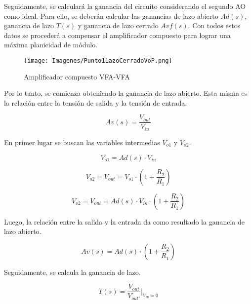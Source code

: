 \documentclass[12pt,A4paper,titlepage]{article}
\begin{document}
\bigskip
\hspace{1mm} Seguidamente, se calculará la ganancia del circuito considerando el segundo AO como ideal. Para ello, se deberán calcular las ganancias de lazo abierto \(Ad(s)\), ganancia de lazo \(T(s)\) y ganancia de lazo cerrado \(Avf(s)\). Con todos estos datos se procederá a compensar el amplificador compuesto para lograr una máxima planicidad de módulo.

\begin{figure}[!h]
    \centering
    \texttt{[image: Imagenes/Punto1LazoCerradoVoP.png]}
    \caption{Amplificador compuesto VFA-VFA}
\end{figure}

\hspace{1mm} Por lo tanto, se comienza obteniendo la ganancia de lazo abierto. Esta misma es la relación entre la tensión de salida y la tensión de entrada.

\begin{equation}
    Av(s) = \frac{V_{out}}{V_{in}}
\end{equation}

\bigskip
\hspace{1mm} En primer lugar se buscan las variables intermedias \(V_{o1}\) y \(V_{o2}\).

\begin{equation}
    V_{o1} = Ad(s)\cdot V_{in} 
\end{equation}

\begin{equation}
     V_{o2} =V_{out}= V_{o1}\cdot (1+\frac{R_2}{R_1})
\end{equation}

\begin{equation}
    V_{o2} =V_{out}= Ad(s) \cdot V_{in} \cdot (1+\frac{R_2}{R_1})
\end{equation}

\hspace{1mm} Luego, la relación entre la salida y la entrada da como resultado la ganancia de lazo abierto.

\begin{equation}
    \boxed{
    Av(s) = Ad(s)\cdot (1+\frac{R_2}{R_1})
    }
\end{equation}

\bigskip
\hspace{1mm} Seguidamente, se calcula la ganancia de lazo.

\bigskip
\begin{equation}
    T(s) = \frac{V_{out}}{V_{out'}}|_{V_{in}=0} 
\end{equation}
\end{document}
